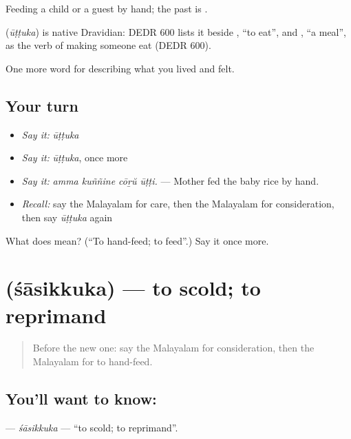 Feeding a child or a guest by hand; the past is .

\begin{cousinweb}
\textbf{} (\emph{ūṭṭuka}) is native Dravidian: DEDR 600 lists it beside , \textquotedblleft{}to eat\textquotedblright{}, and , \textquotedblleft{}a meal\textquotedblright{}, as the verb of making someone eat (DEDR 600).
\end{cousinweb}

\begin{grammarlens}[title={What you've built}]
One more word for describing what you lived and felt.
\end{grammarlens}

\subsection*{Your turn}
\begin{itemize}
\raggedright
  \item \emph{Say it:} \emph{ūṭṭuka}
  \item \emph{Say it:} \emph{ūṭṭuka}, once more
  \item \emph{Say it:} \emph{amma kuññine cōṟŭ ūṭṭi.} — Mother fed the baby rice by hand.
  \item \emph{Recall:} say the Malayalam for care, then the Malayalam for consideration, then say \emph{ūṭṭuka} again
\end{itemize}

\begin{tcolorbox}[breakable,colback=teal!4,colframe=teal!35!black,title={Before you move on}]
What does  mean? (\textquotedblleft{}To hand-feed; to feed\textquotedblright{}.) Say it once more.
\end{tcolorbox}
\section[\texorpdfstring{\ml{ശാസിക്കുക} (śāsikkuka)}{ശാസിക്കുക (śāsikkuka)}]{ (śāsikkuka) — to scold; to reprimand}

\label{lesson:ML-C557-sasikkuka}



\begin{quote}
Before the new one: say the Malayalam for consideration, then the Malayalam for to hand-feed.
\end{quote}

\subsection*{You'll want to know: }
\textbf{} — \emph{śāsikkuka} — \textquotedblleft{}to scold; to reprimand\textquotedblright{}.

